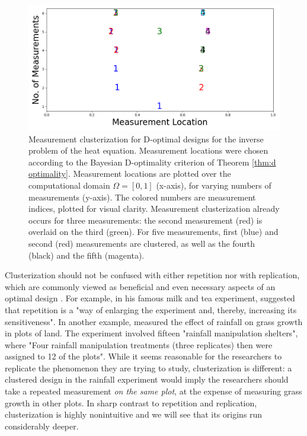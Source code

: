 \begin{figure}
    \centering
    \includegraphics[height=0.5\textwidth]{dst_modelError0.png}
    \caption{Measurement clusterization for D-optimal designs for the
      inverse problem of the heat equation. Measurement locations were
      chosen according to the Bayesian D-optimality criterion of
      Theorem \ref{thm:d optimality}. Measurement locations are
      plotted over the computational domain \(\Omega = [0, 1]\)
      (x-axis), for varying numbers of measurements (y-axis). The
      colored numbers are measurement indices, plotted for visual
      clarity. Measurement clusterization already occurs for three
      measurements: the second measurement (red) is overlaid on the
      third (green). For five measurements, first (blue) and second
      (red) measurements are clustered, as well as the fourth (black)
      and the fifth (magenta).}
  \label{fig:clusterization illustration}
\end{figure}


Clusterization should not be confused with either repetition nor with
replication, which are commonly viewed as beneficial and even
necessary aspects of an optimal design \cite{fisher1949design,
  morris2011, schafer2001replication}. For example,
\cite{fisher1949design} in his famous milk and tea experiment,
suggested that repetition is a "way of enlarging the experiment and,
thereby, increasing its sensitiveness". In another example,
\cite{fay2000rainfall} measured the effect of rainfall on grass growth
in plots of land. The experiment involved fifteen "rainfall
manipulation shelters", where "Four rainfall manipulation treatments
(three replicates) then were assigned to 12 of the plots". While it
seems reasonable for the researchers to replicate the phenomenon they
are trying to study, clusterization is different: a clustered design
in the rainfall experiment would imply the researchers should take a
repeated measurement \emph{on the same plot}, at the expense of
measuring grass growth in other plots. In sharp contrast to repetition
and replication, clusterization is highly nonintuitive and we will see
that its origins run considerably deeper.


